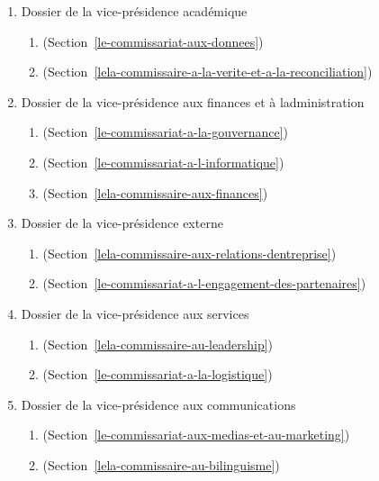 \begin{enumerate}
  \begin{enumerate}
   \item
    Dossier de la vice-présidence académique
    \begin{enumerate}
     \item
       (Section~\ref{le-commissariat-aux-donnees})
     \item
       (Section~\ref{lela-commissaire-a-la-verite-et-a-la-reconciliation})
    \end{enumerate}
   \item
    Dossier de la vice-présidence aux finances et à l\textquotesingle administration
    \begin{enumerate}
     \item
       (Section~\ref{le-commissariat-a-la-gouvernance})
     \item
       (Section~\ref{le-commissariat-a-l-informatique})
     \item
       (Section~\ref{lela-commissaire-aux-finances})
    \end{enumerate}
   \item
    Dossier de la vice-présidence externe
    \begin{enumerate}
     \item
       (Section~\ref{lela-commissaire-aux-relations-dentreprise})
     \item
       (Section~\ref{le-commissariat-a-l-engagement-des-partenaires})
    \end{enumerate}
   \item
    Dossier de la vice-présidence aux services
    \begin{enumerate}
     \item
       (Section~\ref{lela-commissaire-au-leadership})
     \item
       (Section~\ref{le-commissariat-a-la-logistique})
    \end{enumerate}
   \item
    Dossier de la vice-présidence aux communications
    \begin{enumerate}
     \item
       (Section~\ref{le-commissariat-aux-medias-et-au-marketing})
     \item
       (Section~\ref{lela-commissaire-au-bilinguisme})
    \end{enumerate}
  \end{enumerate}


\end{enumerate}
